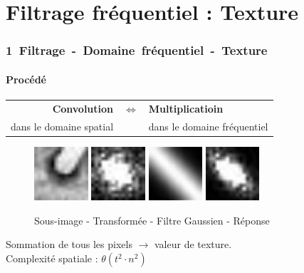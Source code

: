 \documentclass[french]{beamer}
\begin{document}
\section{Filtrage fréquentiel : Texture}

\begin{frame}
	\frametitle{\mbox{1 Filtrage - Domaine fréquentiel - Texture}}
	\framesubtitle{Procédé}
	\begin{tabular}{rcl}
		\textbf{Convolution}& $\Longleftrightarrow$ & \textbf{Multiplicatioin} \\
		dans le domaine spatial & & dans le domaine fréquentiel \\
	\end{tabular}
	\begin{figure}
		\includegraphics[width=2cm]{images/roller_subim.jpg} \; \includegraphics[width=2cm]{images/roller_subimfft.jpg} \;
		\includegraphics[width=2cm]{images/roller_subimf.jpg} \; \includegraphics[width=2cm]{images/roller_subimresp.jpg}\\
		\caption{Sous-image \; - \; Transformée \; - \; Filtre Gaussien \; - \; Réponse}
	\end{figure}
	\bigskip
	Sommation de tous les pixels $\longrightarrow$ valeur de texture.\\
	\medskip
	Complexité spatiale : $\theta(t^2 \cdot n^2)$
\end{frame}
\end{document}
